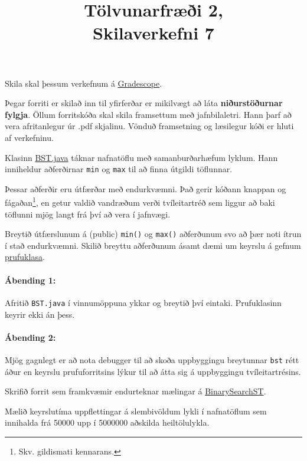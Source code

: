 \documentclass{article}
\title{Tölvunarfræði 2, \semester \\ Skilaverkefni 7}
\author{}
\begin{document}
\maketitle
{}

Skila skal þessum verkefnum á \href{https://gradescope.com/courses/14122}{Gradescope}.

Þegar forriti er skilað inn til yfirferðar er mikilvægt að láta \textbf{niðurstöðurnar fylgja}. Öllum forritskóða skal skila framsettum með jafnbilaletri. Hann þarf að vera afritanlegur úr .pdf skjalinu. Vönduð framsetning og læsilegur kóði er hluti af verkefninu.

\question

Klasinn \href{https://algs4.cs.princeton.edu/code/edu/princeton/cs/algs4/BST.java.html}{BST.java} táknar nafnatöflu með samanburðarhæfum lyklum. Hann inniheldur aðferðirnar \texttt{min} og \texttt{max} til að finna útgildi töflunnar.

Þessar aðferðir eru útfærðar með endurkvæmni. Það gerir kóðann knappan og fágaðan\footnote{Skv. gildismati kennarans.}, en getur valdið vandræðum verði tvíleitartréð sem liggur að baki töflunni mjög langt frá því að vera í jafnvægi.

Breytið útfærslunum á (public) \texttt{min()} og \texttt{max()} aðferðunum svo að þær noti ítrun í stað endurkvæmni. Skilið breyttu aðferðunum ásamt dæmi um keyrslu á gefnum \href{https://github.com/Ernir/kennsluefni/tree/master/T2/Code/w8/BSTTest.java}{prufuklasa}.

\paragraph{Ábending 1:} Afritið \texttt{BST.java} í vinnumöppuna ykkar og breytið því eintaki. Prufuklasinn keyrir ekki án þess.

\paragraph{Ábending 2:} Mjög gagnlegt er að nota debugger til að skoða uppbyggingu breytunnar \texttt{bst} rétt áður en keyrslu prufuforritsins lýkur til að átta sig á uppbyggingu tvíleitartrésins.

\question

Skrifið forrit sem framkvæmir endurteknar mælingar á \href{https://algs4.cs.princeton.edu/code/edu/princeton/cs/algs4/BinarySearchST.java.html}{BinarySearchST}.

Mælið keyrslutíma uppflettingar á slembivöldum lykli í nafnatöflum sem innihalda frá 50000 upp í 5000000 aðskilda heiltölulykla. 
\end{document}

